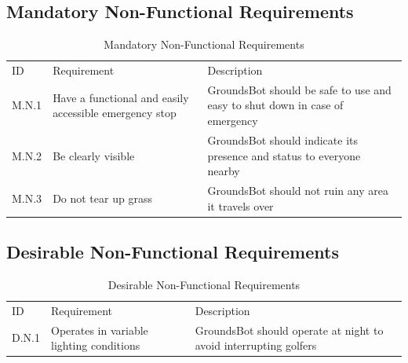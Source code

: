 \documentclass[12pt]{extarticle}
\begin{document}
\subsection{Mandatory Non-Functional Requirements}
\begin{center}
  \begin{table}[H]
   \caption{Mandatory Non-Functional Requirements}
    \label{table: mandatory non-functional}
    

    \def\arraystretch{1.5}
    \begin{tabularx}{\textwidth}{ lXX }
     \hline
  	 \sffamily\normalsize{ID} & \sffamily\normalsize{Requirement} & \sffamily\normalsize{Description} \\  
  	  M.N.1 &
  	  Have a functional and easily accessible emergency stop &
  	  GroundsBot should be safe to use and easy to shut down in case of emergency\\
  	  M.N.2 &
  	  Be clearly visible &
  	  GroundsBot should indicate its presence and status to everyone nearby \\
  	  M.N.3 &
  	  Do not tear up grass &
  	  GroundsBot should not ruin any area it travels over \\
  	\end{tabularx}
  \end{table}
\end{center}

\subsection{Desirable Non-Functional Requirements}
\begin{center}
  \begin{table}[H]
  	\caption{Desirable Non-Functional Requirements}
  	\label{table: desirable non-functional}

  	\def\arraystretch{1.5}
	\begin{tabularx}{\textwidth}{ lXX }
  	\hline
  	  \sffamily\normalsize{ID} & \sffamily\normalsize{Requirement} &
  	  \sffamily\normalsize{Description} \\
  	  D.N.1 &
  	  Operates in variable lighting conditions &
  	  GroundsBot should operate at night to avoid interrupting golfers\\
	\end{tabularx}
  \end{table}
\end{center}


\newpage
\end{document}
